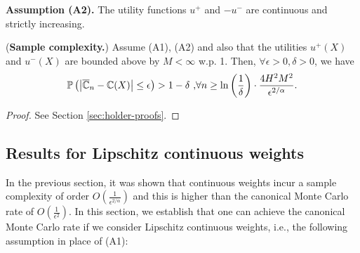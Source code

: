 \noindent\textbf{Assumption (A2).}  The utility functions $u^+$ and $-u^-$ are continuous and strictly increasing.


\begin{proposition}(\textbf{Sample complexity.})
\label{prop:holder-dkw}
Assume (A1), (A2) and also that the utilities $u^+(X)$ and $u^-(X)$ are bounded above by $M<\infty$ w.p. 1. Then, $\forall \epsilon >0, \delta >0$, we have
$$
\mathbb{P}\left( \left |\overline {\mathbb{C}}_n- \mathbb{C}(X) \right| \leq  \epsilon  \right) >1- \delta\text{     ,} \forall n \geq \ln\left(\frac{1}{\delta}\right)\cdot 
\frac{4H^2 M^2}{\epsilon^{2/\alpha}}.$$
\end{proposition}

\begin{proof}
%
%
See Section \ref{sec:holder-proofs}.
\end{proof}

\subsection{Results for Lipschitz continuous weights}
In the previous section, it was shown that \holder continuous weights incur a sample complexity of order $O\left(\frac1{\epsilon^{2/\alpha}}\right)$ and this is higher than the canonical Monte Carlo rate of $O\left(\frac1{\epsilon^2}\right)$. In this section, we establish that one can achieve the canonical Monte Carlo rate if we consider Lipschitz continuous weights, i.e., the following assumption in place of (A1):
 
